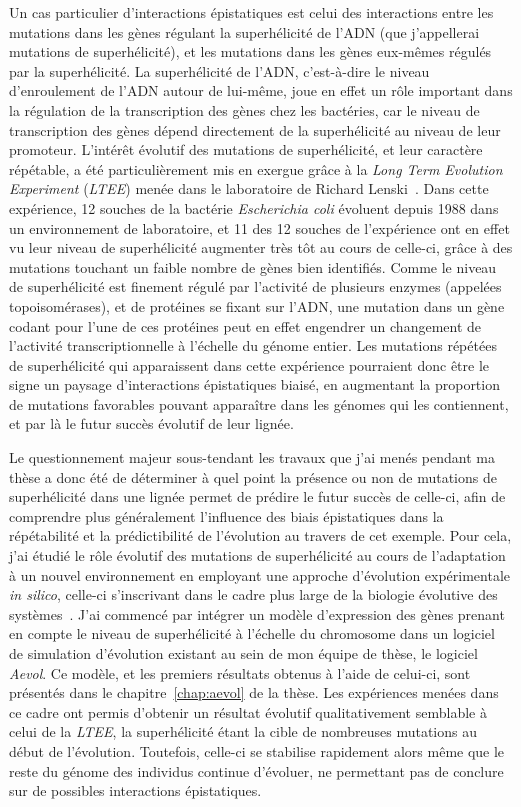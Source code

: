 Un cas particulier d'interactions épistatiques est celui des interactions entre les mutations dans les gènes régulant la superhélicité de l'ADN (que j'appellerai mutations de superhélicité), et les mutations dans les gènes eux-mêmes régulés par la superhélicité.
La superhélicité de l'ADN, c'est-à-dire le niveau d'enroulement de l'ADN autour de lui-même, joue en effet un rôle important dans la régulation de la transcription des gènes chez les bactéries, car le niveau de transcription des gènes dépend directement de la superhélicité au niveau de leur promoteur.
L'intérêt évolutif des mutations de superhélicité, et leur caractère répétable, a été particulièrement mis en exergue grâce à la \emph{Long Term Evolution Experiment} (\emph{LTEE}) menée dans le laboratoire de Richard Lenski~\citep{lenski1991}.
Dans cette expérience, 12 souches de la bactérie \emph{Escherichia coli} évoluent depuis 1988 dans un environnement de laboratoire, et 11 des 12 souches de l'expérience ont en effet vu leur niveau de superhélicité augmenter très tôt au cours de celle-ci, grâce à des mutations touchant un faible nombre de gènes bien identifiés.
Comme le niveau de superhélicité est finement régulé par l'activité de plusieurs enzymes (appelées topoisomérases), et de protéines se fixant sur l'ADN, une mutation dans un gène codant pour l'une de ces protéines peut en effet engendrer un changement de l'activité transcriptionnelle à l'échelle du génome entier.
Les mutations répétées de superhélicité qui apparaissent dans cette expérience pourraient donc être le signe un paysage d'interactions épistatiques biaisé, en augmentant la proportion de mutations favorables pouvant apparaître dans les génomes qui les contiennent, et par là le futur succès évolutif de leur lignée.

Le questionnement majeur sous-tendant les travaux que j'ai menés pendant ma thèse a donc été de déterminer à quel point la présence ou non de mutations de superhélicité dans une lignée permet de prédire le futur succès de celle-ci, afin de comprendre plus généralement l'influence des biais épistatiques dans la répétabilité et la prédictibilité de l'évolution au travers de cet exemple.
Pour cela, j'ai étudié le rôle évolutif des mutations de superhélicité au cours de l'adaptation à un nouvel environnement en employant une approche d'évolution expérimentale \emph{in silico}, celle-ci s'inscrivant dans le cadre plus large de la biologie évolutive des systèmes~\citep{beslon2021}.
J'ai commencé par intégrer un modèle d'expression des gènes prenant en compte le niveau de superhélicité à l'échelle du chromosome dans un logiciel de simulation d'évolution existant au sein de mon équipe de thèse, le logiciel \emph{Aevol}.
Ce modèle, et les premiers résultats obtenus à l'aide de celui-ci, sont présentés dans le chapitre~\ref{chap:aevol} de la thèse.
Les expériences menées dans ce cadre ont permis d'obtenir un résultat évolutif qualitativement semblable à celui de la \emph{LTEE}, la superhélicité étant la cible de nombreuses mutations au début de l'évolution.
Toutefois, celle-ci se stabilise rapidement alors même que le reste du génome des individus continue d'évoluer, ne permettant pas de conclure sur de possibles interactions épistatiques.

